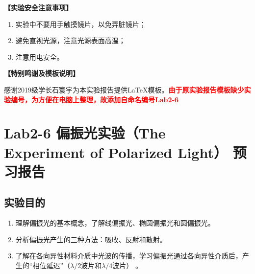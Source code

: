 \documentclass[dvipsnames, svgnames,a4paper,11pt]{article}
\begin{document}
	\textbf{【实验安全注意事项】}	
	\begin{enumerate}
		\item 实验中不要用手触摸镜片，以免弄脏镜片；
		\item 避免直视光源，注意光源表面高温；
		\item 注意用电安全。		
	\end{enumerate}
	
	
	\textbf{【特别鸣谢及模板说明】}	
	
	感谢2019级学长石寰宇为本实验报告提供\LaTeX 模板。\textcolor{red}{\textbf{由于原实验报告模板缺少实验编号，为方便在电脑上整理，故添加自命名编号Lab2-6}}
	
	
	
	\clearpage
	\tableofcontents
	\clearpage
	
	
	
	
	\setcounter{section}{0}
	\section{Lab2-6 偏振光实验（The Experiment of Polarized Light） \quad\heiti 预习报告}
	
	\subsection{实验目的}
	\begin{enumerate}
		\item 理解偏振光的基本概念，了解线偏振光、椭圆偏振光和圆偏振光。
		\item 分析偏振光产生的三种方法：吸收、反射和散射。
		\item 了解在各向异性材料介质中光波的传播，学习偏振光通过各向异性介质后，产生的“相位延迟”（$\lambda/ 2$波片和$\lambda/ 4$波片） 。
		
	\end{enumerate}
	
\end{document}
